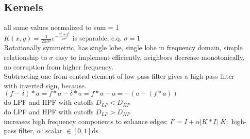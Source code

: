 \subsection*{Kernels}
 all same values normalized to sum = 1\\
 $K(x, y) = \frac{1}{2\pi \sigma^{2}} e^{-\frac{x^{2} + y^{2}}{2\sigma^{2}}}$ is separable, e.q. $\sigma = 1$\\
Rotationally symmetric, has single lobe, single lobe in frequency domain, simple relationship to $\sigma$ easy to implement efficiently, neighbors decrease monotonically, no corruption from higher frequency. \\
Subtracting one from central element of low-pass filter gives a high-pass filter with inverted sign, because.\\
$(f - \delta) * a = f * a - \delta * a = f * a - a = - (a - (f * a))$\\
 do LPF and HPF with cutoffs $D_{LP} < D_{HP}$\\
 do LPF and HPF with cutoffs $D_{LP} > D_{HP}$\\
 increases high frequency components to enhance edges: $I' = I + \alpha |K * I|$ $K:$ high-pass filter, $\alpha$: scalar $\in [0, 1]$ds